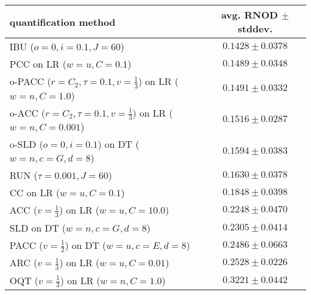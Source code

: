 \begin{tabular}{lc}
  \toprule
  quantification method & avg. RNOD $\pm$ stddev. \\
  \midrule
  IBU ($o=0, i=0.1, J=60$) & $\mathbf{0.1428 \pm 0.0378}$ \\
  PCC on LR ($w=u, C=0.1$) & $\mathbf{0.1489 \pm 0.0348}$ \\
  o-PACC ($r=C_2, \tau=0.1, v=\frac{1}{3}$) on LR ($w=n, C=1.0$) & $0.1491 \pm 0.0332$ \\
  o-ACC ($r=C_2, \tau=0.1, v=\frac{1}{3}$) on LR ($w=n, C=0.001$) & $0.1516 \pm 0.0287$ \\
  o-SLD ($o=0, i=0.1$) on DT ($w=n, c=G, d=8$) & $0.1594 \pm 0.0383$ \\
  RUN ($\tau=0.001, J=60$) & $0.1630 \pm 0.0378$ \\
  CC on LR ($w=u, C=0.1$) & $0.1848 \pm 0.0398$ \\
  ACC ($v=\frac{1}{3}$) on LR ($w=u, C=10.0$) & $0.2248 \pm 0.0470$ \\
  SLD on DT ($w=n, c=G, d=8$) & $0.2305 \pm 0.0414$ \\
  PACC ($v=\frac{1}{2}$) on DT ($w=u, c=E, d=8$) & $0.2486 \pm 0.0663$ \\
  ARC ($v=\frac{1}{3}$) on LR ($w=u, C=0.01$) & $0.2528 \pm 0.0226$ \\
  OQT ($v=\frac{1}{3}$) on LR ($w=n, C=1.0$) & $0.3221 \pm 0.0442$ \\
  \bottomrule
\end{tabular}
